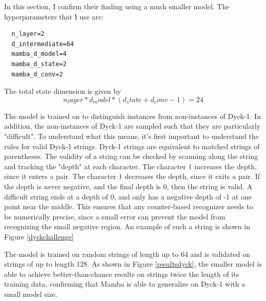 In this section, I confirm their finding using a much smaller model.
The hyperparameters that I use are:
\begin{verbatim}
  n_layer=2
  d_intermediate=64
  mamba_d_model=4
  mamba_d_state=2
  mamba_d_conv=2
\end{verbatim}

The total state dimension is given by
$$
n_layer * d_model * (d_state + d_conv - 1) = 24
$$

The model is trained on to distinguish instances from non-instances of Dyck-1.
In addition, the non-instances of Dyck-1 are sampled such that they are
particularly "difficult".
To understand what this means, it's first important to understand the rules for
valid Dyck-1 strings.
Dyck-1 strings are equivalent to matched strings of parentheses.
The validity of a string can be checked by scanning along the string and
tracking the "depth" at each character. The character \verb|(| increases the
depth, since it enters a pair. The character \verb|)| decreases the depth, since
it exits a pair.
If the depth is never negative, and the final depth is 0, then the string is
valid.
A difficult string ends at a depth of 0, and only has a negative depth of -1 at
one point near the middle.
This ensures that any counter-based recognizer needs to be numerically precise,
since a small error can prevent the model from recognizing the small negative
region.
An example of such a string is shown in Figure \ref{dyckchallenge}

The model is trained on random strings of length up to 64 and is validated on
strings of up to length 128.
As shown in Figure \ref{resultsdyck}, the smaller model is able to achieve
better-than-chance results on strings twice the length of its training data,
confirming that Mamba is able to generalize on Dyck-1 with a small model size.
